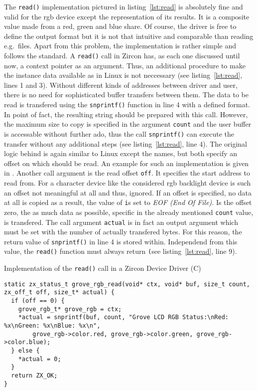 The \texttt{read()} implementation pictured in listing~\ref{lst:read} is absolutely fine and valid for the \ac{rgb} device except the representation of its results.
It is a composite value made from a red, green and blue share.
Of course, the driver is free to define the output format but it is not that intuitive and comparable than reading e.g.\ files.
Apart from this problem, the implementation is rather simple and follows the standard.
A \texttt{read()} call in Zircon has, as each one discussed until now, a context pointer as an argument.
Thus, an additional procedure to make the instance data available as in Linux is not neccessary (see listing~\ref{lst:read}, lines 1 and 3).
Without different kinds of addresses between driver and user, there is no need for sophisticated buffer transfers between them.
The data to be read is transfered using the \texttt{snprintf()} function in line 4 with a defined format.
In point of fact, the resulting string should be prepared with this call.
However, the maximum size to copy is specified in the argument \texttt{count} and the user buffer is accessable without further ado, thus the call \texttt{snprintf()} can execute the transfer without any additional steps (see listing~\ref{lst:read}, line 4).
The original logic behind is again similar to Linux except the names, but both specify an offset on which should be read.
An example for such an implementation is given in \cite{zircon-simpledrv}.
Another call argument is the read offset \texttt{off}.
It specifies the start address to read from.
For a character device like the considered \ac{rgb} backlight device is such an offset not meaningful at all and thus, ignored.
If an offset is specified, no data at all is copied as a result, the value of \texttt is set to \textit{EOF (End Of File)}.
Is the offset zero, the as much data as possible, specific in the already mentioned \texttt{count} value, is transfered.
The call argument \texttt{actual} is in fact an output argument which must be set with the number of actually transfered bytes.
For this reason, the return value of \texttt{snprintf()} in line 4 is stored within.
Independend from this value, the \texttt{read()} function must always return \texttt (see listing~\ref{lst:read}, line 9).


\begin{listing} [H]
    \caption{Implementation of the \texttt{read()} call in a Zircon Device Driver (C)}
\label{lst:read}
\begin{verbatim}
static zx_status_t grove_rgb_read(void* ctx, void* buf, size_t count, zx_off_t off, size_t* actual) {
  if (off == 0) {
    grove_rgb_t* grove_rgb = ctx;
    *actual = snprintf(buf, count, "Grove LCD RGB Status:\nRed: %x\nGreen: %x\nBlue: %x\n",
        grove_rgb->color.red, grove_rgb->color.green, grove_rgb->color.blue);
  } else {
    *actual = 0;
  }
  return ZX_OK;
}
\end{verbatim}
\end{listing}


